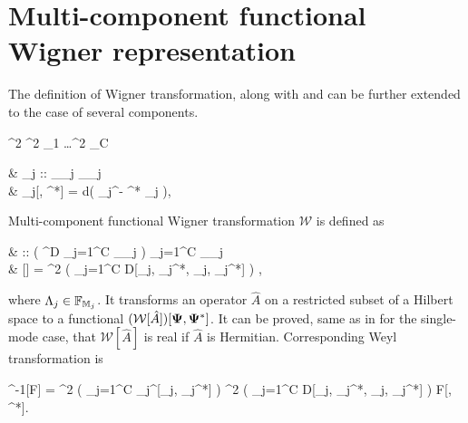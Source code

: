 \section{Multi-component functional Wigner representation}

The definition of Wigner transformation, along with  and  can be further extended to the case of several components.

\begin{definition}
	\begin{eqn*}
		\int \delta^2 \bLambda \equiv \int \delta^2 \Lambda_1 \ldots \int \delta^2 \Lambda_C
	\end{eqn*}
\end{definition}

\begin{definition}
	\begin{eqn*}
		& _j :: _{\restbasis_j} \rightarrow {}_{\restbasis_j} \\
		& _j[\Lambda, \Lambda^*] = \exp \int d\xvec \left(
			\Lambda \Psiop_j^\dagger - \Lambda^* \Psiop_j
		\right),
	\end{eqn*}
\end{definition}

\begin{definition}
\label{def:wigner:mc:w-transformation}
	Multi-component functional Wigner transformation $\mathcal{W}$ is defined as
	\begin{eqn*}
		&  :: \left( ^D \rightarrow \prod_{j=1}^C _{\restbasis_j} \right)
			\rightarrow \prod_{j=1}^C _{\restbasis_j}
			\rightarrow \mathbb{C} \\
		& [\hat{A}]
		=  \int \delta^2 \bLambda
			\left( \prod_{j=1}^C D[\Lambda_j, \Lambda_j^*, \Psi_j, \Psi_j^*] \right)
			\Trace{ \hat{A} \prod_{j=1}^C \hat{D}_j[\Lambda_j, \Lambda_j^*] },
	\end{eqn*}
	where $\Lambda_j \in \mathbb{F}_{\mathbb{M}_j}$.
	It transforms an operator $\hat{A}$ on a restricted subset of a Hilbert space to a functional $(\mathcal{W}[\hat{A}])[\boldsymbol{\Psi}, \boldsymbol{\Psi}^*]$.
	It can be proved, same as in  for the single-mode case, that $\mathcal{W}[\hat{A}]$ is real if $\hat{A}$ is Hermitian.
	Corresponding Weyl transformation is
	\begin{eqn*}
		^{-1}[F]
		=  \int \delta^2 \bXi
			\left( \prod_{j=1}^C _j^{\dagger}[\Xi_j, \Xi_j^*] \right)
			\int \delta^2 \bPhi
				\left( \prod_{j=1}^C D[\Phi_j, \Phi_j^*, \Xi_j, \Xi_j^*] \right)
				F[\bPhi, \bPhi^*].
	\end{eqn*}
\end{definition}

